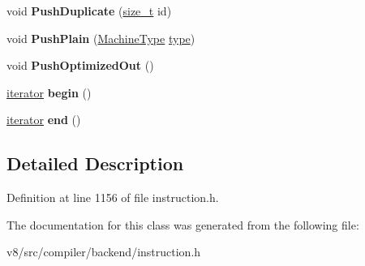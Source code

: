 \begin{DoxyCompactItemize}
void {\bfseries Push\+Duplicate} (\mbox{\hyperlink{classsize__t}{size\+\_\+t}} id)
\item 
\mbox{\label{classv8_1_1internal_1_1compiler_1_1StateValueList_a40c5b96af4a30065903d80cf7ff0c42a}} 
void {\bfseries Push\+Plain} (\mbox{\hyperlink{classv8_1_1internal_1_1MachineType}{Machine\+Type}} \mbox{\hyperlink{classstd_1_1conditional_1_1type}{type}})
\item 
\mbox{\label{classv8_1_1internal_1_1compiler_1_1StateValueList_aa2c6f177b9a247c17d8e51cb32ee413d}} 
void {\bfseries Push\+Optimized\+Out} ()
\item 
\mbox{\label{classv8_1_1internal_1_1compiler_1_1StateValueList_ac44bb257aef290c0cbf0ebce3af31a0b}} 
\mbox{\hyperlink{classv8_1_1internal_1_1compiler_1_1StateValueList_1_1iterator}{iterator}} {\bfseries begin} ()
\item 
\mbox{\label{classv8_1_1internal_1_1compiler_1_1StateValueList_a64cb205dadb71d16d6f598ac1a7ce2ee}} 
\mbox{\hyperlink{classv8_1_1internal_1_1compiler_1_1StateValueList_1_1iterator}{iterator}} {\bfseries end} ()
\end{DoxyCompactItemize}


\subsection{Detailed Description}


Definition at line 1156 of file instruction.\+h.



The documentation for this class was generated from the following file\+:\begin{DoxyCompactItemize}
\item 
v8/src/compiler/backend/instruction.\+h\end{DoxyCompactItemize}

